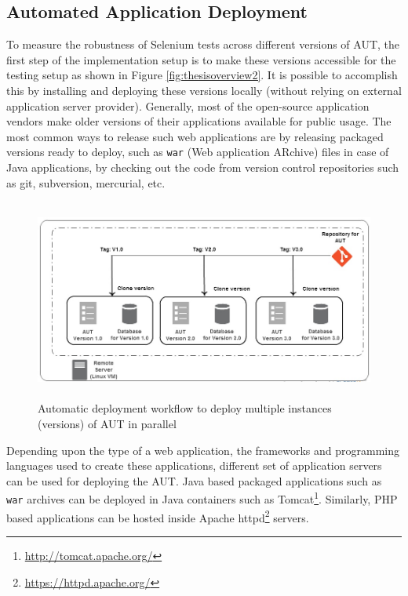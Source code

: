 \subsection{Automated Application Deployment}
\label{sec:autoDeployment}




To measure the robustness of Selenium tests across different versions of AUT, the first step of the implementation setup is to make these versions accessible for the testing setup as shown in Figure \ref{fig:thesisoverview2}. It is possible to accomplish this by installing and deploying these versions locally (without relying on external application server provider). Generally, most of the open-source application vendors make older versions of their applications available for public usage. The most common ways to release such web applications are by releasing packaged versions ready to deploy, such as \texttt{war} (Web application ARchive) files in case of Java applications, by checking out the code from version control repositories such as git, subversion, mercurial, etc.

\begin{figure}[h]
\makeatletter 
\makeatother
    \centering
  \includegraphics[width=5.4in,height=2.6in]{./Figures/Deployment_Process_2.jpg}
  \captionsetup{justification=raggedright,
singlelinecheck=false
}
  \caption{Automatic deployment workflow to deploy multiple instances (versions) of AUT in parallel}
  \label{fig:deployment} 
\end{figure}

Depending upon the type of a web application, the frameworks and programming languages used to create these applications, different set of application servers can be used for deploying the AUT. Java based packaged applications such as \texttt{war} archives can be deployed in Java containers such as Tomcat\footnote{\url{http://tomcat.apache.org/}}. Similarly, PHP based applications can be hosted inside Apache httpd\footnote{\url{https://httpd.apache.org/}} servers. 

